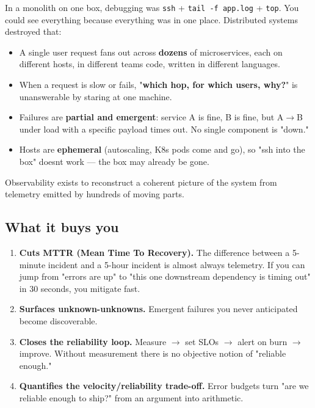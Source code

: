 \documentclass[11pt]{article}
\providecommand{\tightlist}{\setlength{\itemsep}{1pt}\setlength{\parskip}{0pt}}
\begin{document}
In a monolith on one box, debugging was \texttt{ssh} + \texttt{tail\ -f\ app.log} + \texttt{top}. You could see everything because everything was in one place. Distributed systems destroyed that:

\begin{itemize}
\tightlist
\item
  A single user request fans out across \textbf{dozens} of microservices, each on different hosts, in different teams\textquotesingle{} code, written in different languages.
\item
  When a request is slow or fails, "\textbf{which hop, for which users, why?}" is unanswerable by staring at one machine.
\item
  Failures are \textbf{partial and emergent}: service A is fine, B is fine, but A\(\rightarrow\)B under load with a specific payload times out. No single component is "down."
\item
  Hosts are \textbf{ephemeral} (autoscaling, K8s pods come and go), so "ssh into the box" doesn\textquotesingle t work --- the box may already be gone.
\end{itemize}

Observability exists to reconstruct a coherent picture of the system from telemetry emitted by hundreds of moving parts.

\subsection{What it buys you}\label{what-it-buys-you}

\begin{enumerate}
\def\labelenumi{\arabic{enumi}.}
\tightlist
\item
  \textbf{Cuts MTTR (Mean Time To Recovery).} The difference between a 5-minute incident and a 5-hour incident is almost always telemetry. If you can jump from "errors are up" to "this one downstream dependency is timing out" in 30 seconds, you mitigate fast.
\item
  \textbf{Surfaces unknown-unknowns.} Emergent failures you never anticipated become discoverable.
\item
  \textbf{Closes the reliability loop.} Measure \(\rightarrow\) set SLOs \(\rightarrow\) alert on burn \(\rightarrow\) improve. Without measurement there is no objective notion of "reliable enough."
\item
  \textbf{Quantifies the velocity/reliability trade-off.} Error budgets turn "are we reliable enough to ship?" from an argument into arithmetic.
\end{enumerate}
\end{document}
